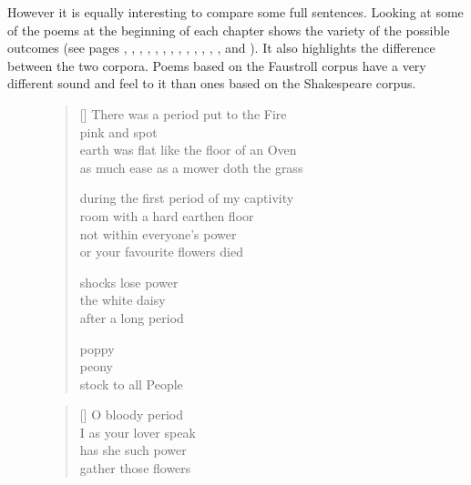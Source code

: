 \spirals

However it is equally interesting to compare some full sentences. Looking at some of the poems at the beginning of each chapter shows the variety of the possible outcomes (see pages \pageref{ch:introduction}, \pageref{ch:inspirations}, \pageref{ch:methodology}, \pageref{ch:pataphysics}, \pageref{ch:creativity}, \pageref{ch:technology}, \pageref{ch:evaluation}, \pageref{ch:foundations}, \pageref{ch:interpretation}, \pageref{ch:implementation}, \pageref{ch:applications}, \pageref{ch:analysis}, \pageref{ch:future}, and \pageref{ch:observations}). It also highlights the difference between the two corpora. Poems based on the Faustroll corpus have a very different sound and feel to it than ones based on the Shakespeare corpus.

\begin{figure}[!htbp]
\centering
\begin{minipage}{.45\linewidth}
  \settowidth{\versewidth}{earth was flat like the floor of an Oven}
  \begin{verse}[\versewidth]\sffamily\footnotesize
    There was a period put to the Fire\\
    pink and spot\\
    earth was flat like the floor of an Oven\\
    as much ease as a mower doth the grass

    during the first period of my captivity\\
    room with a hard earthen floor\\
    not within everyone's power\\
    or your favourite flowers died

    shocks lose power\\
    the white daisy\\
    after a long period

    poppy\\
    peony\\
    stock to all People
  \end{verse}
\end{minipage}
\hspace{.02\linewidth}
\begin{minipage}{.45\linewidth}
  \settowidth{\versewidth}{led by their master to the flow'red fields}
  \begin{verse}[\versewidth]\sffamily\footnotesize
    O bloody period\\
    I as your lover speak\\
    has she such power\\
    gather those flowers


\end{verse}
\end{minipage}
\end{figure}
